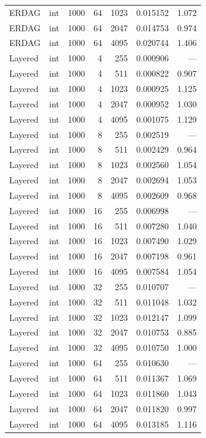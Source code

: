 \begin{longtable}{l l r r r r r}
ERDAG & int & 1000 & 64 & 1023 & 0.015152 & 1.072 \\
ERDAG & int & 1000 & 64 & 2047 & 0.014753 & 0.974 \\
ERDAG & int & 1000 & 64 & 4095 & 0.020744 & 1.406 \\
\addlinespace
Layered & int & 1000 & 4 & 255 & 0.000906 & --- \\
Layered & int & 1000 & 4 & 511 & 0.000822 & 0.907 \\
Layered & int & 1000 & 4 & 1023 & 0.000925 & 1.125 \\
Layered & int & 1000 & 4 & 2047 & 0.000952 & 1.030 \\
Layered & int & 1000 & 4 & 4095 & 0.001075 & 1.129 \\
\addlinespace
Layered & int & 1000 & 8 & 255 & 0.002519 & --- \\
Layered & int & 1000 & 8 & 511 & 0.002429 & 0.964 \\
Layered & int & 1000 & 8 & 1023 & 0.002560 & 1.054 \\
Layered & int & 1000 & 8 & 2047 & 0.002694 & 1.053 \\
Layered & int & 1000 & 8 & 4095 & 0.002609 & 0.968 \\
\addlinespace
Layered & int & 1000 & 16 & 255 & 0.006998 & --- \\
Layered & int & 1000 & 16 & 511 & 0.007280 & 1.040 \\
Layered & int & 1000 & 16 & 1023 & 0.007490 & 1.029 \\
Layered & int & 1000 & 16 & 2047 & 0.007198 & 0.961 \\
Layered & int & 1000 & 16 & 4095 & 0.007584 & 1.054 \\
\addlinespace
Layered & int & 1000 & 32 & 255 & 0.010707 & --- \\
Layered & int & 1000 & 32 & 511 & 0.011048 & 1.032 \\
Layered & int & 1000 & 32 & 1023 & 0.012147 & 1.099 \\
Layered & int & 1000 & 32 & 2047 & 0.010753 & 0.885 \\
Layered & int & 1000 & 32 & 4095 & 0.010750 & 1.000 \\
\addlinespace
Layered & int & 1000 & 64 & 255 & 0.010630 & --- \\
Layered & int & 1000 & 64 & 511 & 0.011367 & 1.069 \\
Layered & int & 1000 & 64 & 1023 & 0.011860 & 1.043 \\
Layered & int & 1000 & 64 & 2047 & 0.011820 & 0.997 \\
Layered & int & 1000 & 64 & 4095 & 0.013185 & 1.116 \\

\end{longtable}
